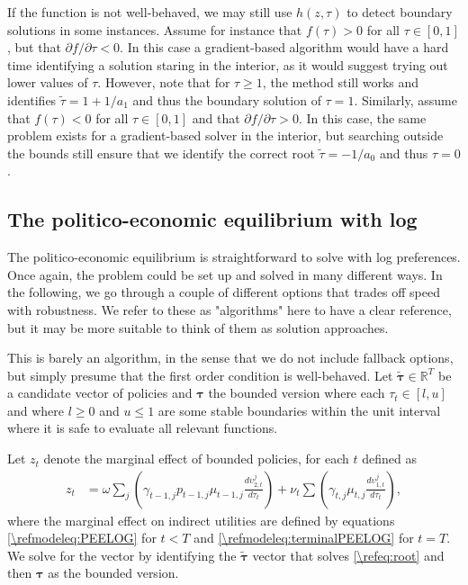\documentclass[a4paper]{article}
\begin{document}
If the function is not well-behaved, we may still use $h(z, \tau)$ to detect boundary solutions in some instances. Assume for instance that $f(\tau) >0$ for all $\tau\in[0,1]$, but that $\partial f/\partial \tau <0$. In this case a gradient-based algorithm would have a hard time identifying a solution staring in the interior, as it would suggest trying out lower values of $\tau$. However, note that for $\tau\geq 1$, the method still works and identifies $\tilde{\tau} = 1+1/a_1$ and thus the boundary solution of $\tau = 1$. Similarly, assume that $f(\tau)<0$ for all $\tau\in[0,1]$ and  that $\partial f/\partial \tau >0$. In this case, the same problem exists for a gradient-based solver in the interior, but searching outside the bounds still ensure that we identify the correct root $\tilde{\tau} = -1/a_0$ and thus $\tau = 0$. 





\subsection{The politico-economic equilibrium with log}\label{\refsec:PEELOG}
The politico-economic equilibrium is straightforward to solve with log preferences. Once again, the problem could be set up and solved in many different ways. In the following, we go through a couple of different options that trades off speed with robustness. We refer to these as "algorithms" here to have a clear reference, but it may be more suitable to think of them as solution approaches.



\begin{alg}
\label{\refalg:LOG:fast}
This is barely an algorithm, in the sense that we do not include fallback options, but simply presume that the first order condition is well-behaved. Let $\tilde{\bm{\tau}} \in \mathbb{R}^{T}$ be a candidate vector of policies and $\bm{\tau}$ the bounded version where each $\tau_t \in [l, u]$ and where $l\geq 0$ and $u\leq 1$ are some stable boundaries within the unit interval where it is safe to evaluate all relevant functions. 

Let $z_t$ denote the marginal effect of bounded policies, for each $t$ defined as
\begin{align}\label{\refeq:LOG:fast}
    z_t &= \omega\sum_{j}\left(\gamma_{t-1,j}p_{t-1,j}\mu_{t-1,j} \frac{d\upsilon_{2,t}^j}{d\tau_t}\right)+\nu_t\sum\left(\gamma_{t,j}\mu_{t,j} \frac{d\upsilon_{1,t}^j}{d\tau_t}\right), 
\end{align}
where the marginal effect on indirect utilities are defined by equations \eqref{\refmodeleq:PEELOG} for $t<T$ and \eqref{\refmodeleq:terminalPEELOG} for $t=T$. We solve for the vector by identifying the $\tilde{\bm{\tau}}$ vector that solves \eqref{\refeq:root} and then $\bm{\tau}$ as the bounded version.
\end{alg}
\end{document}
